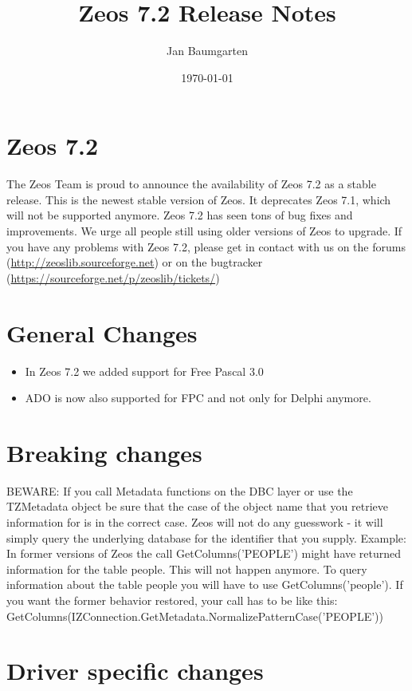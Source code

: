 \documentclass[a4paper,12pt,oneside]{article}
\title{Zeos 7.2 Release Notes}
\author{Jan Baumgarten}
\date{\today}
\begin{document}
\maketitle

\section{Zeos 7.2}
The Zeos Team is proud to announce the availability of Zeos 7.2 as a stable release.
This is the newest stable version of Zeos.
It deprecates Zeos 7.1, which will not be supported anymore.
Zeos 7.2 has seen tons of bug fixes and improvements.
We urge all people still using older versions of Zeos to upgrade.
If you have any problems with Zeos 7.2, please get in contact with us on the forums (\url{http://zeoslib.sourceforge.net}) or on the bugtracker (\url{https://sourceforge.net/p/zeoslib/tickets/})

\section{General Changes}
\begin{itemize}
\item In Zeos 7.2 we added support for Free Pascal 3.0
\item ADO is now also supported for FPC and not only for Delphi anymore.
\end{itemize}

\section{Breaking changes}
BEWARE: If you call Metadata functions on the DBC layer or use the TZMetadata object be sure that the case of the object name that you retrieve information for is in the correct case.
Zeos will not do any guesswork - it will simply query the underlying database for the identifier that you supply.
Example: In former versions of Zeos the call GetColumns('PEOPLE') might have returned information for the table people.
This will not happen anymore.
To query information about the table people you will have to use GetColumns('people').
If you want the former behavior restored, your call has to be like this:\\
GetColumns(\-IZConnection.\-GetMetadata.\-NormalizePatternCase('PEOPLE'))

\section{Driver specific changes}
\end{document}
